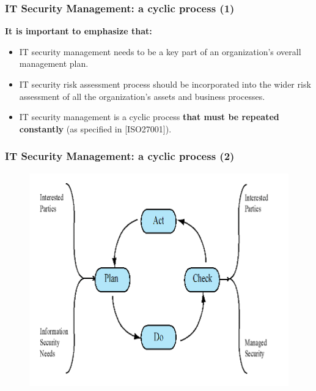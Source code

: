 \documentclass[xcolor ={table,usenames,dvipsnames}]{beamer}
\theoremstyle{definition}
\begin{document}
	\begin{frame}
		\frametitle{IT Security Management: a cyclic process (1)}
	    \textbf{It is important to emphasize that:}
	    \begin{itemize}
	    	\item IT security management needs to be a key part of an organization’s overall management plan.
	    	\item IT security risk assessment process should be incorporated into the
	    	wider risk assessment of all the organization’s assets and business processes.
	    	\item IT security management is a cyclic process \textbf{that must be repeated constantly} (as specified in [ISO27001]).
	    \end{itemize} 
	\end{frame}
	
	\begin{frame}
		\frametitle{IT Security Management: a cyclic process (2)}
			\begin{figure}[h!]
			\centering
			\includegraphics[scale=0.50]{img/img_02.PNG}
			\label{Interfacce di un CS}
		\end{figure}
	\end{frame}
	
\end{document}

